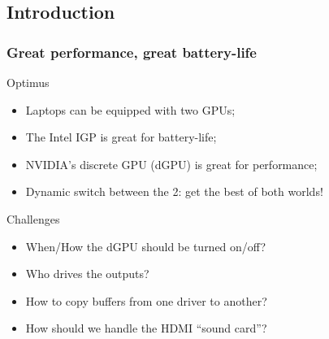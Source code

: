 \documentclass[11pt,english,compress]{beamer}
\begin{document}
\subsection{Introduction}
\begin{frame}
	\frametitle{Great performance, great battery-life}

	\begin{block}{Optimus}
		\begin{itemize}
			\item Laptops can be equipped with two GPUs;
			\item The Intel IGP is great for battery-life;
			\item NVIDIA's discrete GPU (dGPU) is great for performance;
			\item Dynamic switch between the 2: get the best of both worlds!
		\end{itemize}
	\end{block}

	\begin{block}{Challenges}
		\begin{itemize}
			\item When/How the dGPU should be turned on/off?
			\item Who drives the outputs?
			\item How to copy buffers from one driver to another?
			\item How should we handle the HDMI ``sound card''?
		\end{itemize}
	\end{block}
\end{frame}
\end{document}
